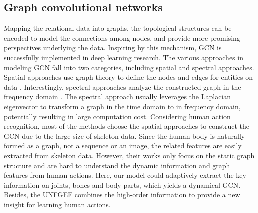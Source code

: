 \documentclass[journal]{IEEEtran}
\begin{document}
\subsection{Graph convolutional networks}
Mapping the relational data into graphs, the topological structures can be encoded to model the connections among nodes, and provide more promising perspectives underlying the data. Inspiring by this mechanism, GCN is successfully implemented in deep learning research.  The various approaches in modeling GCN fall into two categories, including spatial and spectral approaches. Spatial approaches use graph theory to define the nodes and edges for entities on data \cite{duvenaud2015convolutional,shi2020skeleton}. Interestingly, spectral approaches analyze the constructed graph in the frequency domain \cite{kipf2016semi}. The spectral approach usually leverages the Laplacian eigenvector to transform a graph in the time domain to in frequency domain, potentially resulting in large computation cost. Considering human action recognition, most of the methods choose the spatial approaches to construct the GCN due to the large size of skeleton data. Since the human body is naturally formed as a graph, not a sequence or an image, the related features are easily extracted from skeleton data. However, their works only focus on the static graph structure and are hard to understand the dynamic information and graph features from human actions.  Here, our model could adaptively extract the key information on joints, bones and body parts, which yields a dynamical GCN. Besides, the UNFGEF combines the high-order information to provide a new insight for learning human actions.
\end{document}
